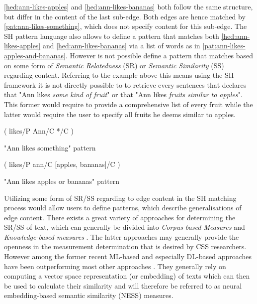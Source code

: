 \documentclass[11pt]{scrreprt}
\let\cite\parencite  %
\begin{document}
\cref{hed:ann-likes-apples} and \cref{hed:ann-likes-bananas} both follow the same structure, but differ in the content of the last sub-edge. Both edges are hence matched by \cref{pat:ann-likes-something}, which does not specify content for this sub-edge.
The SH pattern language also allows to define a pattern that matches both \cref{hed:ann-likes-apples} and \cref{hed:ann-likes-bananas} via a list of words as in \cref{pat:ann-likes-apples-and-bananas}. However is not possible define a pattern that matches based on some form of \textit{Semantic Relatedness} (SR) or \textit{Semantic Similarity} (SS) \cite{harispeSemanticSimilarityNatural2015} regarding content.
Referring to the example above this means using the SH framework it is not directly possible to to retrieve every sentences that declares that "Ann likes \textit{some kind of fruit}" or that "Ann likes \textit{fruits similar to apples}". This former would require to provide a comprehensive list of every fruit while the latter would require the user to specify all fruits he deems similar to apples.

\begin{pattern}[h!]
  \normalfont\sffamily
  \centering
  ( likes/P Ann/C */C )
  \caption{"Ann likes something" pattern}
  \label{pat:ann-likes-something}
\end{pattern}

\begin{pattern}[h!]
  \normalfont\sffamily
  \centering
  ( likes/P ann/C [apples, bananas]/C )
  \caption{"Ann likes apples or bananas" pattern}
  \label{pat:ann-likes-apples-and-bananas}
\end{pattern}

Utilizing some form of SR/SS regarding to edge content in the SH matching process would allow users to define patterns, which describe generalisations of edge content. There exists a great variety of approaches for determining the SR/SS of text, which can generally be divided into \textit{Corpus-based Measures} and \textit{Knowledge-based measures} \cite[Section~1.3.2]{harispeSemanticSimilarityNatural2015}. The latter approaches may generally provide the openness in the measurement determination that is desired by CSS researchers. However among the former recent ML-based and especially DL-based approaches have been outperforming most other approaches \cite{chandrasekaranEvolutionSemanticSimilarity2021}. They generally rely on computing a vector space representation (or embedding) of texts which can then be used to calculate their similarity and will therefore be referred to as neural embedding-based semantic similarity (NESS) measures.
\end{document}
